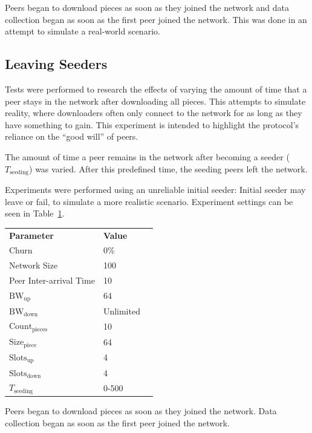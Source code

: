 \documentclass[a4paper,12pt,twocolumn]{article}
\newcommand{\tref}[1]{Table~\ref{#1}}
\begin{document}
Peers began to download pieces as soon as they joined the network and data collection began as soon as the first peer joined the network.
This was done in an attempt to simulate a real-world scenario.

\subsection{Leaving Seeders}
\label{subsec:leaving_seeders}
Tests were performed to research the effects of varying the amount of time that a peer stays in the network after downloading all pieces. This attempts to simulate reality, where downloaders often only connect to the network for as long as they have something to gain. This experiment is intended to highlight the protocol's reliance on the ``good will'' of peers.

The amount of time a peer remains in the network after becoming a seeder ($T_{\text{seeding}}$) was varied. After this predefined time, the seeding peers left the network.

Experiments were performed using an unreliable initial seeder: Initial seeder may leave or fail, to simulate a more realistic scenario. Experiment settings can be seen in \tref{tab:leaving_seeders}.

\begin{table}[!htbp]
\centering
\footnotesize
\begin{tabular}{lll}
\textbf{Parameter} & \textbf{Value} \\
Churn & 0\% \\
Network Size & 100 \\
Peer Inter-arrival Time & 10 \\
$\text{BW}_{\text{up}}$ & 64 \\
$\text{BW}_{\text{down}}$ & Unlimited \\
$\text{Count}_{\text{pieces}}$ & 10 \\
$\text{Size}_{\text{piece}}$ & 64 \\
$\text{Slots}_{\text{up}}$ & 4 \\
$\text{Slots}_{\text{down}}$ & 4 \\
$T_{\text{seeding}}$ & 0-500 \\
\end{tabular}
\label{tab:leaving_seeders}
\end{table}

Peers began to download pieces as soon as they joined the network. Data collection began as soon as the first peer joined the network.
\end{document}
